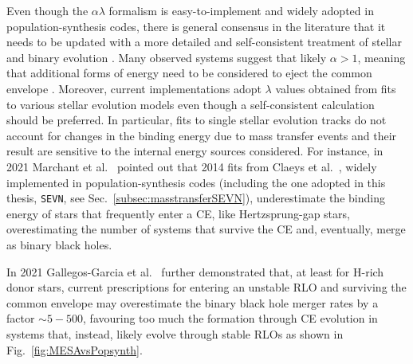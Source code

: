 \documentclass[a4paper,titlepage]{book}     	%
\begin{document}
Even though the $\alpha \lambda$ formalism is easy-to-implement and widely adopted in population-synthesis codes, there is general consensus in the literature that it needs to be updated with a more detailed and self-consistent treatment of stellar and binary evolution \cite{marchant2021_masstransferMESA}. Many observed systems suggest that likely $\alpha > 1$, meaning that additional forms of energy need to be considered to eject the common envelope \cite{mapelli}. Moreover, current implementations adopt $\lambda$ values obtained from fits to various stellar evolution models even though  a self-consistent calculation should be preferred. In particular, fits to single stellar evolution tracks do not account for changes in the binding energy due to mass transfer events and their result are sensitive to the internal energy sources considered. For instance, in 2021 Marchant et al.\ \cite{marchant2021_masstransferMESA} pointed out that 2014 fits from Claeys et al.\ \cite{Clayes2014_lambdaCE}, widely implemented in population-synthesis codes (including the one adopted in this thesis, \texttt{SEVN}, see Sec.\ \ref{subsec:masstransferSEVN}), underestimate the binding energy of stars that frequently enter a CE, like Hertzsprung-gap stars, overestimating the number of systems that survive the CE and, eventually, merge as binary black holes. 


In 2021 Gallegos-Garcia et al.\ \cite{gallegos2021MESAvspopsynth} further demonstrated that, at least for H-rich donor stars, current prescriptions for entering an unstable RLO and surviving the common envelope may overestimate  the binary black hole merger rates by a factor $\sim 5-500$, favouring too much the formation through CE evolution in systems that, instead, likely evolve through stable RLOs as shown in Fig.\ \ref{fig:MESAvsPopsynth}.
\end{document}
